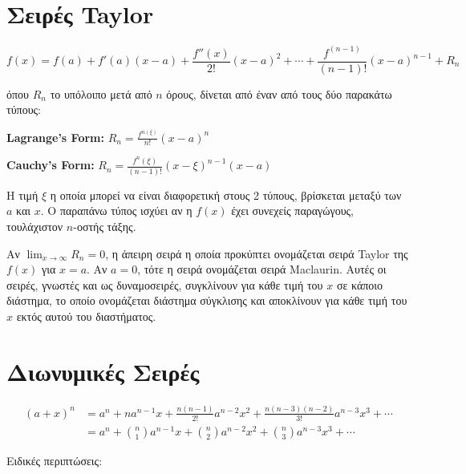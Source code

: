 
\section{Σειρές \textlatin{Taylor}}

\[
	f(x) = f(a) + f'(a)(x-a) + \frac{f''(x)}{2!} (x-a)^{2} + \cdots +
	\frac{f^{(n-1)}}{(n-1)!} (x-a)^{n-1} + R_{n}
\] 

όπου $ R_{n} $ το υπόλοιπο μετά από $n $ όρους, δίνεται από έναν από τους δύο
παρακάτω τύπους:

\textbf{\textlatin{Lagrange's Form:}} $ R_{n} = \frac{f^{n(\xi)}}{n!} (x-a)^{n} $

\textbf{\textlatin{Cauchy's Form:}} $ R_{n} = \frac{f^{n}(\xi)}{(n-1)!}
(x-\xi)^{n-1}(x-a) $

Η τιμή $\xi$ η οποία μπορεί να είναι διαφορετική στους 2 τύπους, βρίσκεται
μεταξύ των $ a $ και $ x$. Ο παραπάνω τύπος ισχύει αν η $ f(x) $ έχει συνεχείς
παραγώγους, τουλάχιστον $ n $-οστής τάξης. 

Αν $ \lim_{x\to \infty} R_{n} = 0 $, η άπειρη σειρά η οποία προκύπτει ονομάζεται
σειρά \textlatin{Taylor} της $ f(x) $ για $ x=a $. Αν $ a = 0 $, τότε η σειρά
ονομάζεται σειρά \textlatin{Maclaurin}. Αυτές οι σειρές, γνωστές και ως
δυναμοσειρές, συγκλίνουν για κάθε τιμή του $x$ σε κάποιο διάστημα, το οποίο
ονομάζεται διάστημα σύγκλισης και αποκλίνουν για κάθε τιμή του $x$ εκτός αυτού
του διαστήματος.

\section{Διωνυμικές Σειρές}

\begin{align*}
	(a+x)^{n} &= a^{n} + na^{n-1}x + \frac{n (n-1)}{2!} a^{n-2}x^{2} +
	\frac{n(n-3)(n-2)}{3!} a^{n-3}x^{3} + \cdots \\
			  &= a^{n} + \binom{n}{1}
			  a^{n-1}x + \binom{n}{2} a^{n-2}x^{2} + \binom{n}{3} a^{n-3}x^{3} +
			  \cdots
\end{align*}

Ειδικές περιπτώσεις:

